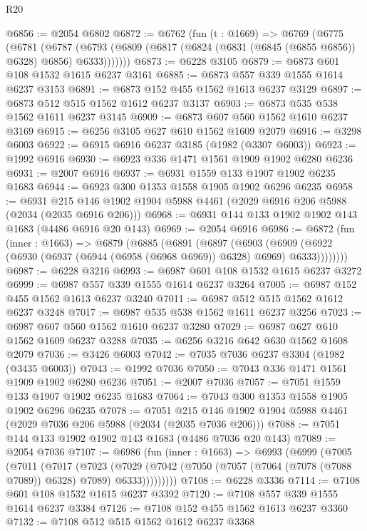 \begin{lexlean}{R20}
\begin{coremodule}
@6856 := @2054 @6802
@6872 := @6762
    (fun (t : @1669) =>
    @6769
      (@6775
        (@6781
          (@6787 (@6793 (@6809 (@6817 (@6824 (@6831 (@6845 (@6855 @6856)) @6328) @6856) @6333)))))))
@6873 := @6228 @3105
@6879 := @6873 @601 @108 @1532 @1615 @6237 @3161
@6885 := @6873 @557 @339 @1555 @1614 @6237 @3153
@6891 := @6873 @152 @455 @1562 @1613 @6237 @3129
@6897 := @6873 @512 @515 @1562 @1612 @6237 @3137
@6903 := @6873 @535 @538 @1562 @1611 @6237 @3145
@6909 := @6873 @607 @560 @1562 @1610 @6237 @3169
@6915 := @6256 @3105 @627 @610 @1562 @1609 @2079
@6916 := @3298 @6003
@6922 := @6915 @6916 @6237 @3185 (@1982 (@3307 @6003))
@6923 := @1992 @6916
@6930 := @6923 @336 @1471 @1561 @1909 @1902 @6280 @6236
@6931 := @2007 @6916
@6937 := @6931 @1559 @133 @1907 @1902 @6235 @1683
@6944 := @6923 @300 @1353 @1558 @1905 @1902 @6296 @6235
@6958 := @6931 @215 @146 @1902 @1904 @5988 @4461 (@2029 @6916 @206 @5988 (@2034 (@2035 @6916 @206)))
@6968 := @6931 @144 @133 @1902 @1902 @143 @1683 (@4486 @6916 @20 @143)
@6969 := @2054 @6916
@6986 := @6872
    (fun (inner : @1663) =>
    @6879
      (@6885
        (@6891
          (@6897
            (@6903
              (@6909 (@6922 (@6930 (@6937 (@6944 (@6958 (@6968 @6969)) @6328) @6969) @6333))))))))
@6987 := @6228 @3216
@6993 := @6987 @601 @108 @1532 @1615 @6237 @3272
@6999 := @6987 @557 @339 @1555 @1614 @6237 @3264
@7005 := @6987 @152 @455 @1562 @1613 @6237 @3240
@7011 := @6987 @512 @515 @1562 @1612 @6237 @3248
@7017 := @6987 @535 @538 @1562 @1611 @6237 @3256
@7023 := @6987 @607 @560 @1562 @1610 @6237 @3280
@7029 := @6987 @627 @610 @1562 @1609 @6237 @3288
@7035 := @6256 @3216 @642 @630 @1562 @1608 @2079
@7036 := @3426 @6003
@7042 := @7035 @7036 @6237 @3304 (@1982 (@3435 @6003))
@7043 := @1992 @7036
@7050 := @7043 @336 @1471 @1561 @1909 @1902 @6280 @6236
@7051 := @2007 @7036
@7057 := @7051 @1559 @133 @1907 @1902 @6235 @1683
@7064 := @7043 @300 @1353 @1558 @1905 @1902 @6296 @6235
@7078 := @7051 @215 @146 @1902 @1904 @5988 @4461 (@2029 @7036 @206 @5988 (@2034 (@2035 @7036 @206)))
@7088 := @7051 @144 @133 @1902 @1902 @143 @1683 (@4486 @7036 @20 @143)
@7089 := @2054 @7036
@7107 := @6986
    (fun (inner : @1663) =>
    @6993
      (@6999
        (@7005
          (@7011
            (@7017
              (@7023
                (@7029
                  (@7042 (@7050 (@7057 (@7064 (@7078 (@7088 @7089)) @6328) @7089) @6333)))))))))
@7108 := @6228 @3336
@7114 := @7108 @601 @108 @1532 @1615 @6237 @3392
@7120 := @7108 @557 @339 @1555 @1614 @6237 @3384
@7126 := @7108 @152 @455 @1562 @1613 @6237 @3360
@7132 := @7108 @512 @515 @1562 @1612 @6237 @3368

\end{coremodule}
\end{lexlean}
